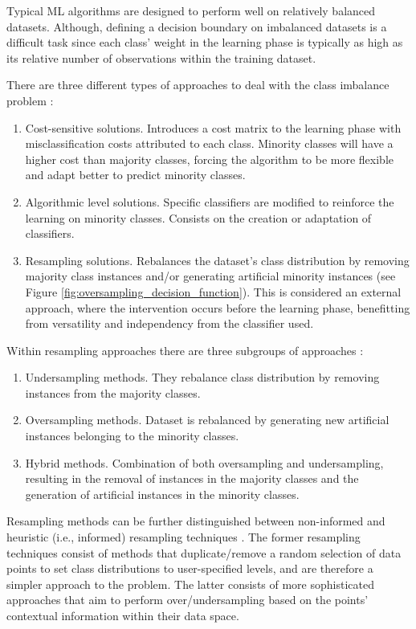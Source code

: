 \documentclass[parskip=full]{scrartcl}
\begin{document}
Typical ML algorithms are designed to perform well on relatively balanced
datasets. Although, defining a decision boundary on imbalanced datasets is a
difficult task since each class' weight in the learning phase is typically as
high as its relative number of observations within the training dataset.

There are three different types of approaches to deal with the class imbalance
problem \cite{Fernandez2013,Kaur2019}:
\begin{enumerate}
	\item Cost-sensitive solutions. Introduces a cost matrix to the learning phase with
	      misclassification costs attributed to each class. Minority classes will have a
	      higher cost than majority classes, forcing the algorithm to be more flexible
	      and adapt better to predict minority classes.
	\item Algorithmic level solutions. Specific classifiers are modified to reinforce the
	      learning on minority classes. Consists on the creation or adaptation of
	      classifiers.
	\item Resampling solutions. Rebalances the dataset's class distribution by removing
	      majority class instances and/or generating artificial minority instances (see
	      Figure \ref{fig:oversampling_decision_function}). This is considered an external  approach, where
	      the intervention occurs before the learning phase, benefitting from versatility
	      and independency from the classifier used.
\end{enumerate}

Within resampling approaches there are three subgroups of approaches
\cite{Fernandez2013,Kaur2019,Luengo2020}:
\begin{enumerate}
	\item Undersampling methods. They rebalance class distribution by removing instances
	      from the majority classes.
	\item Oversampling methods. Dataset is rebalanced by generating new artificial
	      instances belonging to the minority classes.
	\item Hybrid methods. Combination of both oversampling and undersampling, resulting
	      in the removal of instances in the majority classes and the generation of
	      artificial instances in the minority classes.
\end{enumerate}

Resampling methods can be further distinguished between non-informed and
heuristic (i.e., informed) resampling techniques \cite{Fernandez2013,Luengo2020,Garcia2016}. The
former resampling techniques consist of methods that duplicate/remove a random
selection of data points to set class distributions to user-specified levels,
and are therefore a simpler approach to the problem. The latter consists of
more sophisticated approaches that aim to perform over/undersampling based on
the points' contextual information within their data space.
\end{document}

